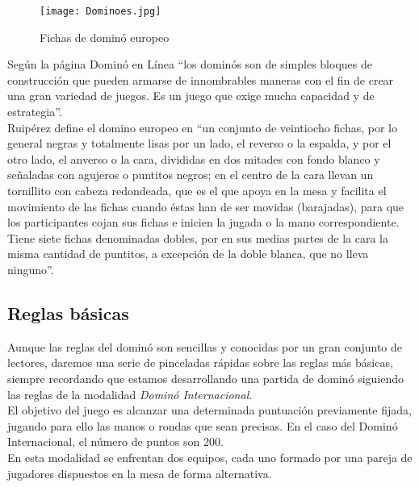 \begin{figure}[h]
  \label{Dominoes}
  \begin{center}
    \texttt{[image: Dominoes.jpg]}
  \end{center}
  \caption{Fichas de dominó europeo}
\end{figure}

Según la página Dominó en Línea \cite{website:dominoenlinea} “los dominós son de simples bloques de construcción
que pueden armarse de innombrables maneras con el fin de crear una gran variedad de juegos. Es un
juego que exige mucha capacidad y de estrategia”. \\

Ruipérez define el domino europeo en “un conjunto de veintiocho fichas, por lo general negras y
totalmente lisas por un lado, el reverso o la espalda, y por el otro lado, el anverso o la cara,
divididas en dos mitades con fondo blanco y señaladas con agujeros o puntitos negros; en el centro
de la cara llevan un tornillito con cabeza redondeada, que es el que apoya en la mesa y facilita
el movimiento de las fichas cuando éstas han de ser movidas (barajadas), para que los participantes
cojan sus fichas e inicien la jugada o la mano correspondiente. Tiene siete fichas denominadas
dobles, por en sus medias partes de la cara la misma cantidad de puntitos, a excepción de la
doble blanca, que no lleva ninguno”. \\

\subsection{Reglas básicas}

Aunque las reglas del dominó son sencillas y conocidas por un gran conjunto de lectores, daremos una
serie de pinceladas rápidas sobre las reglas más básicas, siempre recordando que estamos desarrollando
una partida de dominó siguiendo las reglas de la modalidad \emph{Dominó Internacional}. \\

El objetivo del juego es alcanzar una determinada puntuación previamente fijada, jugando para ello las
manos o rondas que sean precisas. En el caso del Dominó Internacional, el número de puntos son 200. \\

En esta modalidad se enfrentan dos equipos, cada uno formado por una pareja de jugadores dispuestos en
la mesa de forma alternativa. \\

